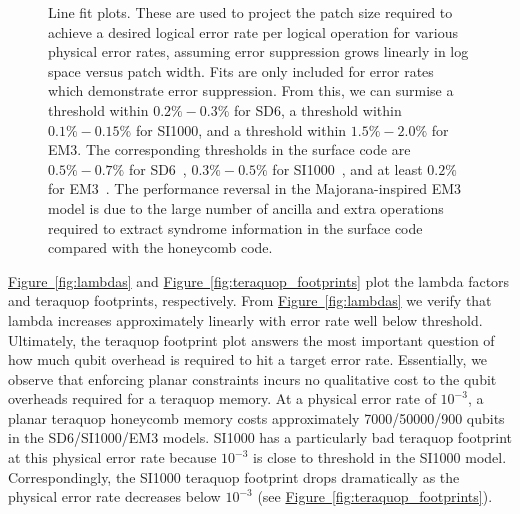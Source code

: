\documentclass[onecolumn,a4paper,accepted=2022-09-12]{quantumarticle}
\theoremstyle{definition}
\theoremstyle{definition}
\theoremstyle{definition}
\newcommand{\fig}[1]{\hyperref[fig:#1]{Figure~\ref*{fig:#1}}}
\begin{document}
\begin{figure}[ht!]
    \centering
    \caption{
    Line fit plots.
    These are used to project the patch size required to achieve a desired logical error rate per logical operation for various physical error rates, assuming error suppression grows linearly in log space versus patch width.
    Fits are only included for error rates which demonstrate error suppression.  From this, we can surmise a threshold within $0.2\%-0.3\%$ for SD6, a threshold within $0.1\%-0.15\%$ for SI1000, and a threshold within $1.5\%-2.0\% $ for EM3.  
    The corresponding thresholds in the surface code are $0.5\%-0.7\%$ for SD6~\cite{gidney2021honeycombmemory}, $0.3\%-0.5\%$ for SI1000~\cite{gidney2021honeycombmemory}, and at least $0.2\%$ for EM3~\cite{chao2020optimization}.
    The performance reversal in the Majorana-inspired EM3 model is due to the large number of ancilla and extra operations required to extract syndrome information in the surface code compared with the honeycomb code.
    }
    \label{fig:line_fits}
\end{figure}

\fig{lambdas} and \fig{teraquop_footprints} plot the lambda factors and teraquop footprints, respectively.  
From \fig{lambdas} we verify that lambda increases approximately linearly with error rate well below threshold.
Ultimately, the teraquop footprint plot answers the most important question of how much qubit overhead is required to hit a target error rate.
Essentially, we observe that enforcing planar constraints incurs no qualitative cost to the qubit overheads required for a teraquop memory.
At a physical error rate of $10^{-3}$, a planar teraquop honeycomb memory costs approximately 7000/50000/900 qubits in the SD6/SI1000/EM3 models.
SI1000 has a particularly bad teraquop footprint at this physical error rate because $10^{-3}$ is close to threshold in the SI1000 model.
Correspondingly, the SI1000 teraquop footprint drops dramatically as the physical error rate decreases below $10^{-3}$ (see \fig{teraquop_footprints}).
\end{document}
